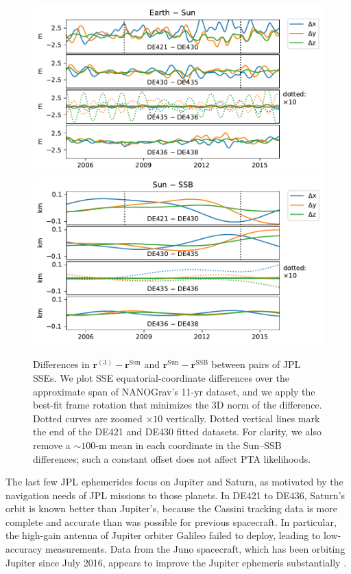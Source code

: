 \documentclass[reprint,
 amsmath,amssymb,
 aps,prd,floatfix,
]{revtex4-1}
\begin{document}
\begin{figure}[t]
    \centering
    \includegraphics[width=\columnwidth]{figures/EarthSunDiff.pdf}
    \includegraphics[width=\columnwidth]{figures/SunSSBDiff.pdf}
    \caption{Differences in $\mathbf{r}^{(3)} - \mathbf{r}^\mathrm{Sun}$ and $\mathbf{r}^\mathrm{Sun} - \mathbf{r}^\mathrm{SSB}$ between pairs of JPL SSEs. We plot SSE equatorial-coordinate differences over the approximate span of NANOGrav's 11-yr dataset, and we apply the best-fit frame rotation that minimizes the 3D norm of the difference. Dotted curves are zoomed $\times 10$ vertically. Dotted vertical lines mark the end of the DE421 and DE430 fitted datasets.
    For clarity, we also remove a $\sim 100$-m mean in each coordinate in the Sun--SSB differences; such a constant offset does not affect PTA likelihoods.
    \label{fig:earthsun}}
\end{figure}

The last few JPL ephemerides focus on Jupiter and Saturn, as motivated by the navigation needs of JPL missions to those planets. In DE421 to DE436, Saturn's orbit is known better than Jupiter's, because the Cassini tracking data is more complete and accurate than was possible for previous spacecraft. In particular, the high-gain antenna of Jupiter orbiter Galileo failed to deploy, leading to low-accuracy measurements. Data from the Juno spacecraft, which has been orbiting Jupiter since July 2016, appears to improve the Jupiter ephemeris substantially \cite{2009IPNPR.178C...1F}.
\end{document}

